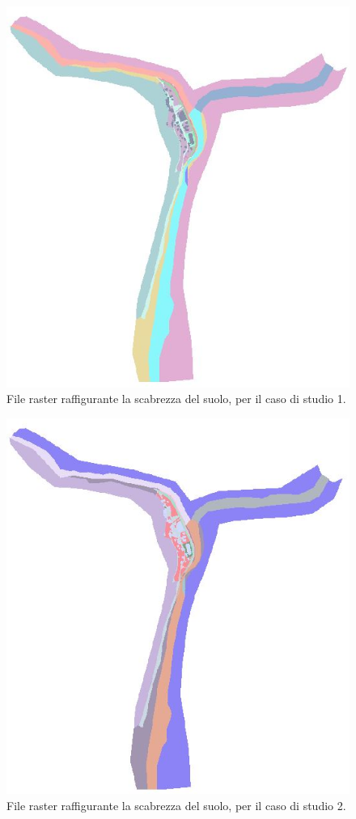 \begin{figure}[H] \centering
    \includegraphics[scale=0.4]{immagini/land_cover_1.JPG}
    \caption{File raster raffigurante la scabrezza del suolo, per il caso di studio 1.}
    \label{figure:land_cover_1}
\end{figure}
\begin{figure}[H] \centering
    \includegraphics[scale=0.4]{immagini/land_cover_2.JPG}
    \caption{File raster raffigurante la scabrezza del suolo, per il caso di studio 2.}
    \label{figure:land_cover_2}
\end{figure}
